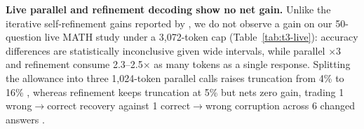 \documentclass{article}
\begin{document}
\textbf{Live parallel and refinement decoding show no net gain.} Unlike the iterative self-refinement gains reported by \citet{madaan2023selfrefine}, we do not observe a gain on our 50-question live MATH study under a 3,072-token cap (Table~\ref{tab:t3-live}): accuracy differences are statistically inconclusive given wide intervals, while parallel $\times 3$ and refinement consume 2.3--2.5$\times$ as many tokens as a single response. Splitting the allowance into three 1,024-token parallel calls raises truncation from 4\% to 16\% \citep{wang2023selfconsistency}, whereas refinement keeps truncation at 5\% but nets zero gain, trading 1 wrong$\to$correct recovery against 1 correct$\to$wrong corruption across 6 changed answers \citep{yao2023treeofthoughts, lightman2024verify}.


\end{document}
